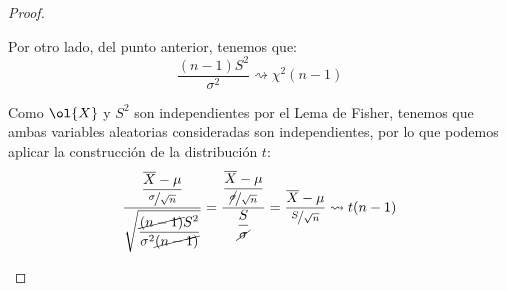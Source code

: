 \begin{coro}
\begin{proof}
\begin{itemize}
            Por otro lado, del punto anterior, tenemos que:
            \begin{equation*}
                \dfrac{(n-1)S^2}{\sigma^2} \rightsquigarrow \chi^2(n-1)
            \end{equation*}

            Como $\ol{X}$ y $S^2$ son independientes por el Lema de Fisher, tenemos que ambas variables aleatorias consideradas son independientes, por lo que podemos aplicar la construcción de la distribución $t$:
            \begin{equation*}
                \dfrac{\dfrac{\overline{X}-\mu}{\nicefrac{\sigma}{\sqrt{n}}}}{\sqrt{\dfrac{\cancel{(n-1)}S^2}{\sigma^2\cancel{(n-1)}}}} = \dfrac{\dfrac{\overline{X}-\mu}{\nicefrac{\cancel{\sigma}}{\sqrt{n}}}}{\dfrac{S}{\cancel{\sigma}}} = \dfrac{\overline{X}-\mu}{\nicefrac{S}{\sqrt{n}}} \rightsquigarrow t(n-1)
            \end{equation*}
    \end{itemize}
\end{proof}
\end{coro}

